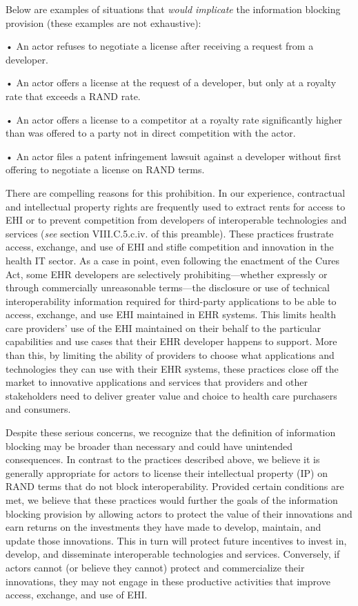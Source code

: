 \documentclass[twoside,11pt]{article}
\begin{document}
          Below are examples of situations that \emph{would implicate} the information blocking provision (these examples are not exhaustive):


          • An actor refuses to negotiate a license after receiving a request from a developer.


          • An actor offers a license at the request of a developer, but only at a royalty rate that exceeds a RAND rate.


          • An actor offers a license to a competitor at a royalty rate significantly higher than was offered to a party not in direct competition with the actor.


          • An actor files a patent infringement lawsuit against a developer without first offering to negotiate a license on RAND terms.



          There are compelling reasons for this prohibition. In our experience, contractual and intellectual property rights are frequently used to extract rents for access to EHI or to prevent competition from developers of interoperable technologies and services (\emph{see} section VIII.C.5.c.iv. of this preamble). These practices frustrate access, exchange, and use of EHI and stifle competition and innovation in the health IT sector. As a case in point, even following the enactment of the Cures Act, some EHR developers are selectively prohibiting—whether expressly or through commercially unreasonable terms—the disclosure or use of technical interoperability information required for third-party applications to be able to access, exchange, and use EHI maintained in EHR systems. This limits health care providers' use of the EHI maintained on their behalf to the particular capabilities and use cases that their EHR developer happens to support. More than this, by limiting the ability of providers to choose what applications and technologies they can use with their EHR systems, these practices close off the market to innovative applications and services that providers and other stakeholders need to deliver greater value and choice to health care purchasers and consumers.


          Despite these serious concerns, we recognize that the definition of information blocking may be broader than necessary and could have unintended consequences. In contrast to the practices described above, we believe it is generally appropriate for actors to license their intellectual property (IP) on RAND terms that do not block interoperability. Provided certain conditions are met, we believe that these practices would further the goals of the information blocking provision by allowing actors to protect the value of their innovations and earn returns on the investments they have made to develop, maintain, and update those innovations. This in turn will protect future incentives to invest in, develop, and disseminate interoperable technologies and services. Conversely, if actors cannot (or believe they cannot) protect and commercialize their innovations, they may not engage in these productive activities that improve access, exchange, and use of EHI.
\end{document}
